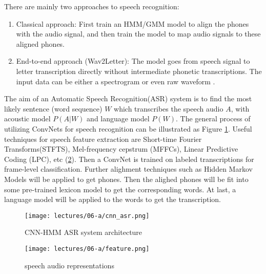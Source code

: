 There are mainly two approaches to speech recognition:
\begin{enumerate}
    \item Classical approach: First train an HMM/GMM model to align the phones with the audio signal, and then train the model to map audio signals to these aligned phones.
    \item End-to-end approach (Wav2Letter): The model goes from speech signal to letter transcription directly without intermediate phonetic transcriptions. The input data can be either a spectrogram or even raw waveform \cite{Collobert2017Wav2LetterAE}.
\end{enumerate}
The aim of an Automatic Speech Recognition(ASR) system is to find the most likely sentence (word sequence) $W$ which transcribes the speech audio $A$, with acoustic model $P(A|W)$ and language model $P(W)$. The general process of utilizing ConvNets for speech recognition can be illustrated as Figure \ref{fig:cnn_asr}.
Useful techniques for speech feature extraction are Short-time Fourier Transforms(STFTS), Mel-frequency cepstrum (MFFCs), Linear Predictive Coding (LPC), etc (\ref{fig:feature}). Then a ConvNet is trained on labeled transcriptions for frame-level classification. Further alighment techniques such as Hidden Markov Models will be applied to get phones. Then the alighed phones will be fit into some pre-trained lexicon model to get the corresponding words. At last, a language model will be applied to the words to get the transcription. 
\begin{figure}[ht]
    \centering
    \texttt{[image: lectures/06-a/cnn\_asr.png]}
    \caption{CNN-HMM ASR system architecture}
    \label{fig:cnn_asr}
\end{figure}
\begin{figure}[ht]
    \centering
    \texttt{[image: lectures/06-a/feature.png]}
    \caption{speech audio representations}
    \label{fig:feature}
\end{figure}